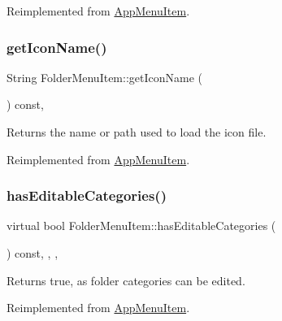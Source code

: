 Reimplemented from \mbox{\hyperlink{classAppMenuItem_a3a9b2ec87af0c063a892753bd64e944a}{App\+Menu\+Item}}.

\mbox{\label{classFolderMenuItem_a0f78f25c3d73abbb3179613b1f40467b}} 
\subsubsection{\texorpdfstring{get\+Icon\+Name()}{getIconName()}}
{\footnotesize\ttfamily String Folder\+Menu\+Item\+::get\+Icon\+Name (\begin{DoxyParamCaption}{ }\end{DoxyParamCaption}) const\hspace{0.3cm}{\ttfamily [override]}, {\ttfamily [virtual]}}

\begin{DoxyReturn}{Returns}
the name or path used to load the icon file. 
\end{DoxyReturn}


Reimplemented from \mbox{\hyperlink{classAppMenuItem_a7c5b3d84b4fa24009e0618e0e3cd804e}{App\+Menu\+Item}}.

\mbox{\label{classFolderMenuItem_aff205a81de032f9ce018d65391a8d638}} 
\subsubsection{\texorpdfstring{has\+Editable\+Categories()}{hasEditableCategories()}}
{\footnotesize\ttfamily virtual bool Folder\+Menu\+Item\+::has\+Editable\+Categories (\begin{DoxyParamCaption}{ }\end{DoxyParamCaption}) const\hspace{0.3cm}{\ttfamily [inline]}, {\ttfamily [override]}, {\ttfamily [protected]}, {\ttfamily [virtual]}}

\begin{DoxyReturn}{Returns}
true, as folder categories can be edited. 
\end{DoxyReturn}


Reimplemented from \mbox{\hyperlink{classAppMenuItem_aa9656d7c1a2dd93bd02f119c0efbb2e0}{App\+Menu\+Item}}.

